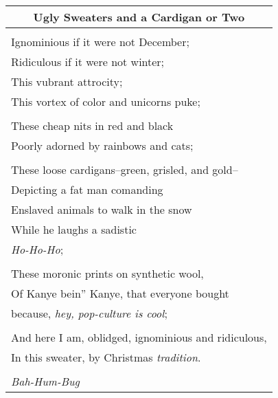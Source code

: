 \documentclass{article}
\begin{document}
\newcommand{\h}{\hspace*{2ex}}
\newcommand{\hh}{\hspace*{4ex}}
\newcommand{\hhh}{\hspace*{6ex}}

\begin{center}
\begin{tabular}{l}
\multicolumn{1}{c}{\textbf{Ugly Sweaters and a Cardigan or Two}} \\\hline
\\
Ignominious if it were not December; \\
Ridiculous if it were not winter; \\
This vubrant attrocity; \\
This vortex of color and unicorns puke; \\
\\
These cheap nits in red and black \\
Poorly adorned by rainbows and cats; \\
\\
These loose cardigans--green, grisled, and gold-- \\
Depicting a fat man comanding \\
Enslaved animals to walk in the snow \\
While he laughs a sadistic \\
\textit{Ho-Ho-Ho}; \\
\\
These moronic prints on synthetic wool, \\
Of Kanye bein'' Kanye, that everyone bought \\
because, \textit{hey, pop-culture is cool}; \\
\\
And here I am, oblidged, ignominious and ridiculous, \\
In this sweater, by Christmas \textit{tradition}. \\
\\
\textit{Bah-Hum-Bug} \\
\end{tabular}
\end{center}
\end{document}
